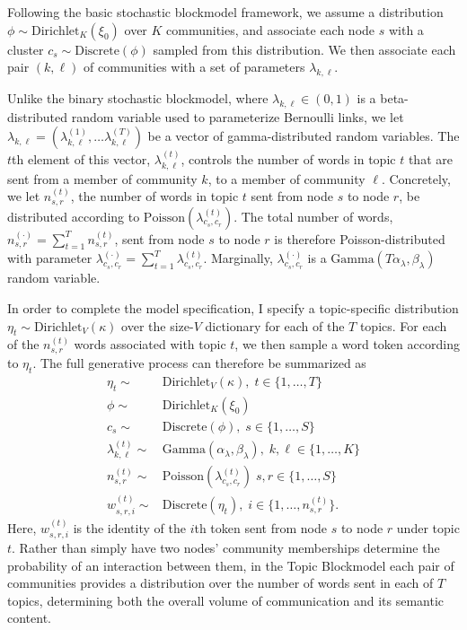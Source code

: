     Following the basic stochastic blockmodel framework, we assume a distribution $\phi\sim \mbox{Dirichlet}_K(\xi_0)$ over $K$ communities, and associate each node $s$ with a cluster $c_s \sim\mbox{Discrete}(\phi)$ sampled from this distribution. We then associate each pair $(k,\ell)$ of communities with a set of parameters $\lambda_{k,\ell}$.
    
    Unlike the binary stochastic blockmodel, where $\lambda_{k,\ell}\in (0,1)$ is a beta-distributed random variable used to parameterize Bernoulli links, we let $\lambda_{k,\ell}=(\lambda_{k,\ell}^{(1)},\dots  \lambda_{k,\ell}^{(T)})$ be a vector of gamma-distributed random variables. The $t$th element of this vector, $\lambda_{k,\ell}^{(t)}$, controls the number of words in topic $t$ that are sent from a member of community $k$, to a member of community $\ell$. Concretely, we let $n_{s,r}^{(t)}$, the number of words in topic $t$ sent from node $s$ to node $r$, be distributed according to $\mbox{Poisson}(\lambda_{c_s,c_r}^{(t)})$. The total number of words, $n_{s,r}^{(\cdot)} = \sum_{t=1}^Tn_{s,r}^{(t)}$, sent from node $s$ to node $r$ is therefore Poisson-distributed with parameter $\lambda_{c_s,c_r}^{(\cdot)}=\sum_{t=1}^T \lambda_{c_s,c_r}^{(t)}$. Marginally, $\lambda_{c_s, c_r}^{(\cdot)}$ is a $\mbox{Gamma}(T\alpha_\lambda, \beta_\lambda)$ random variable.
    
    In order to complete the model specification, I specify a topic-specific distribution $\eta_t \sim \mbox{Dirichlet}_V(\kappa)$ over the size-$V$ dictionary for each of the $T$ topics. For each of the $n_{s,r}^{(t)}$ words associated with topic $t$, we then sample a word token according to $\eta_t$. The full generative process can therefore be summarized as
    \begin{equation}
      \begin{aligned}
        \eta_t \sim& \mbox{Dirichlet}_V(\kappa),\; t\in \{1,\dots,T\}\\
        \phi \sim& \mbox{Dirichlet}_K(\xi_0)\\
        c_s \sim& \mbox{Discrete}(\phi),\; s\in\{1,\dots,S\}\\
        \lambda^{(t)}_{k,\ell}\sim& \mbox{Gamma}(\alpha_\lambda, \beta_\lambda),\; k,\ell \in\{1,\dots, K\}\\
        n_{s,r}^{(t)}\sim& \mbox{Poisson}(\lambda_{c_s,c_r}^{(t)})\; s,r \in\{1,\dots, S\}\\
        w_{s,r,i}^{(t)} \sim& \mbox{Discrete}(\eta_t),\; i\in\{1,\dots, n_{s,r}^{(t)}\}.
      \end{aligned}\label{eqn:PoisForm}
    \end{equation}
    Here, $w_{s,r,i}^{(t)}$ is the identity of the $i$th token sent from node $s$ to node $r$ under topic $t$. Rather than simply have two nodes' community memberships determine the probability of an interaction between them, in the Topic Blockmodel each pair of communities provides a distribution over the number of words sent in each of $T$ topics, determining both the overall volume of communication and its semantic content.
    
